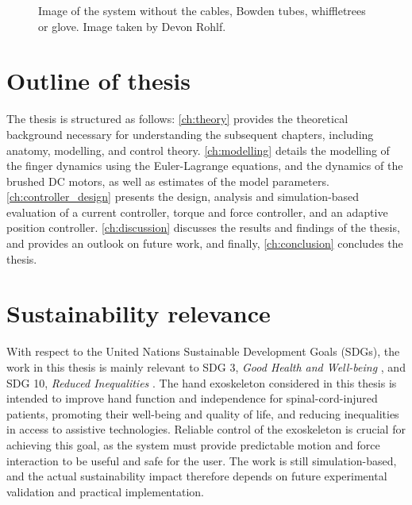 \begin{figure}[htbp]
    \centering
    \caption{Image of the system without the cables, Bowden tubes, whiffletrees or glove. Image taken by Devon Rohlf.}
    \label{fig:introduction_hardware}
\end{figure}

\section{Outline of thesis}

The thesis is structured as follows: \cref{ch:theory} provides the theoretical background necessary for understanding the subsequent chapters, including anatomy, modelling, and control theory. \cref{ch:modelling} details the modelling of the finger dynamics using the Euler-Lagrange equations, and the dynamics of the brushed DC motors, as well as estimates of the model parameters. \cref{ch:controller_design} presents the design, analysis and simulation-based evaluation of a current controller, torque and force controller, and an adaptive position controller. \cref{ch:discussion} discusses the results and findings of the thesis, and provides an outlook on future work, and finally, \cref{ch:conclusion} concludes the thesis.

\section{Sustainability relevance}

With respect to the United Nations Sustainable Development Goals (SDGs), the work in this thesis is mainly relevant to SDG 3, \textit{Good Health and Well-being} \parencite{unSDG3}, and SDG 10, \textit{Reduced Inequalities} \parencite{unSDG10}. The hand exoskeleton considered in this thesis is intended to improve hand function and independence for spinal-cord-injured patients, promoting their well-being and quality of life, and reducing inequalities in access to assistive technologies. Reliable control of the exoskeleton is crucial for achieving this goal, as the system must provide predictable motion and force interaction to be useful and safe for the user. The work is still simulation-based, and the actual sustainability impact therefore depends on future experimental validation and practical implementation.

